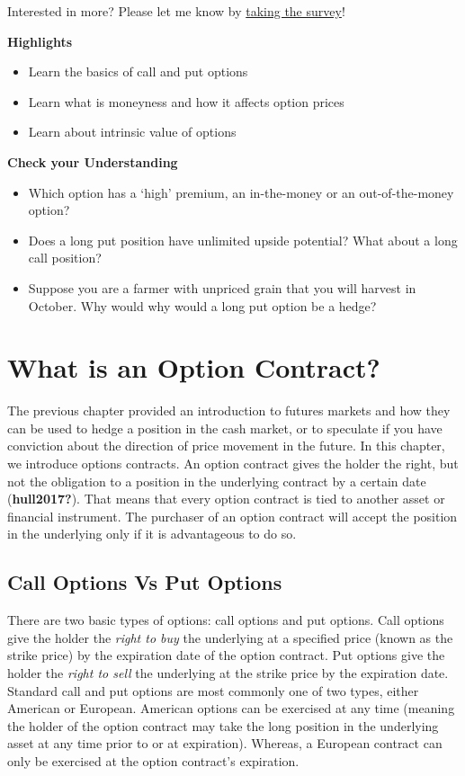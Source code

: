 \documentclass[
  letterpaper,
  DIV=11,
  numbers=noendperiod]{scrreprt}
\begin{document}
{Interested in more? Please let me know by}
\href{https://forms.gle/Q3VByCQZHjfQSy9D7}{taking the survey}!

\textbf{Highlights}

\begin{itemize}
\item
  Learn the basics of call and put options
\item
  Learn what is moneyness and how it affects option prices
\item
  Learn about intrinsic value of options
\end{itemize}

\textbf{Check your Understanding}

\begin{itemize}
\item
  Which option has a `high' premium, an in-the-money or an
  out-of-the-money option?
\item
  Does a long put position have unlimited upside potential? What about a
  long call position?
\item
  Suppose you are a farmer with unpriced grain that you will harvest in
  October. Why would why would a long put option be a hedge?
\end{itemize}

\section{What is an Option Contract?}\label{what-is-an-option-contract}

The previous chapter provided an introduction to futures markets and how
they can be used to hedge a position in the cash market, or to speculate
if you have conviction about the direction of price movement in the
future. In this chapter, we introduce options contracts. An option
contract gives the holder the right, but not the obligation to a
position in the underlying contract by a certain date
(\textbf{hull2017?}). That means that every option contract is tied to
another asset or financial instrument. The purchaser of an option
contract will accept the position in the underlying only if it is
advantageous to do so.

\subsection{Call Options Vs Put
Options}\label{call-options-vs-put-options}

There are two basic types of options: call options and put options. Call
options give the holder the \emph{right to buy} the underlying at a
specified price (known as the strike price) by the expiration date of
the option contract. Put options give the holder the \emph{right to
sell} the underlying at the strike price by the expiration date.
Standard call and put options are most commonly one of two types, either
American or European. American options can be exercised at any time
(meaning the holder of the option contract may take the long position in
the underlying asset at any time prior to or at expiration). Whereas, a
European contract can only be exercised at the option contract's
expiration.
\end{document}
